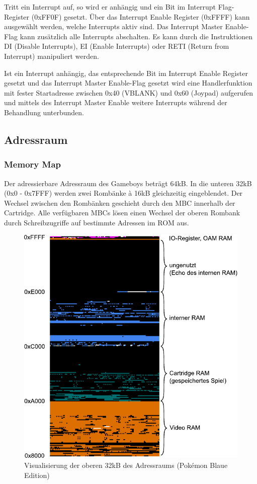 \documentclass[a4paper]{scrartcl}
\begin{document}
Tritt ein Interrupt auf, so wird er anhängig und ein Bit im Interrupt Flag-Register (0xFF0F) gesetzt.
Über das Interrupt Enable Register (0xFFFF) kann ausgewählt werden, welche Interrupts aktiv sind.
Das Interrupt Master Enable-Flag kann zusätzlich alle Interrupts abschalten. Es kann durch die Instruktionen DI (Disable Interrupts), EI (Enable Interrupts) oder RETI (Return from Interrupt) manipuliert werden.

Ist ein Interrupt anhängig, das entsprechende Bit im Interrupt Enable Register gesetzt und das Interrupt Master Enable-Flag gesetzt wird eine Handlerfunktion mit fester Startadresse zwischen 0x40 (VBLANK) und 0x60 (Joypad) aufgerufen und mittels des Interrupt Master Enable weitere Interrupts während der Behandlung unterbunden.
\subsection{Adressraum}

\subsubsection{Memory Map}

Der adressierbare Adressraum des Gameboys beträgt 64kB. In die unteren 32kB (0x0 - 0x7FFF) werden zwei Rombänke à 16kB gleichzeitig eingeblendet. Der Wechsel zwischen den Rombänken geschieht durch den MBC innerhalb der Cartridge. Alle verfügbaren MBCs lösen einen Wechsel der oberen Rombank durch Schreibzugriffe auf bestimmte Adressen im ROM aus.

\begin{figure}[htbp]
\centering
\includegraphics[width=0.75\linewidth]{img/mmap.pdf}
\caption{Visualisierung der oberen 32kB des Adressraums (Pokémon Blaue Edition)}
\label{img:sound}
\end{figure}
\end{document}
